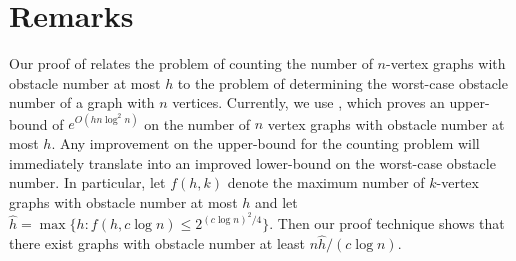 \documentclass{patmorin}
\DeclareMathOperator{\obs}{obs}
\begin{document}
%
%
%
%
%

\section{Remarks}

Our proof of  relates the problem of counting the number
of $n$-vertex graphs with obstacle number at most $h$ to the problem of
determining the worst-case obstacle number of a graph with $n$ vertices.
Currently, we use , which proves an upper-bound of
$e^{O(hn\log^2 n)}$ on the number of $n$ vertex graphs with obstacle
number at most $h$.  Any improvement on the upper-bound for the counting
problem will immediately translate into an improved lower-bound on
the worst-case obstacle number.  In particular, let $f(h,k)$ denote
the maximum number of $k$-vertex graphs with obstacle number at most
$h$ and let $\hat h = \max\{h:f(h,c\log n) \le 2^{(c\log n)^2/4}\}$.
Then our proof technique shows that there exist graphs with obstacle
number at least $n\hat h/(c\log n)$.
\end{document}
